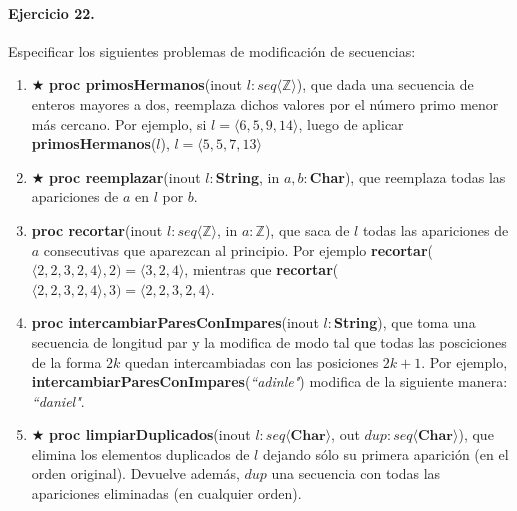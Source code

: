 \documentclass[a4paper]{article}
\begin{document}
\paragraph*{Ejercicio 22.} Especificar los siguientes problemas de modificación de secuencias:
	\begin{enumerate}[label=\alph*)]
		\item $\bigstar$ \textbf{proc primosHermanos}(inout $l:seq\langle \mathbb{Z}\rangle$), que dada una secuencia de enteros mayores a dos, reemplaza dichos valores por el número primo menor más cercano. Por ejemplo, si $l=\langle 6,5,9,14 \rangle$, luego de aplicar \textbf{primosHermanos}($l$), $l=\langle 5,5,7,13 \rangle$
		\item $\bigstar$ \textbf{proc reemplazar}(inout $l:$\textbf{String}, in $a,b:$\textbf{Char}), que reemplaza todas las apariciones de $a$ en $l$ por $b$.
		\item \textbf{proc recortar}(inout $l:seq\langle \mathbb{Z}\rangle$, in $a:\mathbb{Z}$), que saca de $l$ todas las apariciones de $a$ consecutivas que aparezcan al principio. Por ejemplo \textbf{recortar}($\langle 2,2,3,2,4\rangle ,2)=\langle 3,2,4\rangle$, mientras que \textbf{recortar}($\langle 2,2,3,2,4\rangle ,3)=\langle 2,2,3,2,4\rangle$.
		\item \textbf{proc intercambiarParesConImpares}(inout $l:$\textbf{String}), que toma una secuencia de longitud par y la modifica de modo tal que todas las posciciones de la forma $2k$ quedan intercambiadas con las posiciones $2k+1$. Por ejemplo, \textbf{intercambiarParesConImpares}(\textit{``adinle"}) modifica de la siguiente manera: \textit{``daniel"}.
		\item $\bigstar$ \textbf{proc limpiarDuplicados}(inout $l: seq\langle \mathbb{\textbf{Char}}\rangle$, out $dup:seq\langle \mathbb{\textbf{Char}}\rangle$), que elimina los elementos duplicados de $l$ dejando sólo su primera aparición (en el orden original). Devuelve además, $dup$ una secuencia con todas las apariciones eliminadas (en cualquier orden).
	\end{enumerate}
\end{document}
